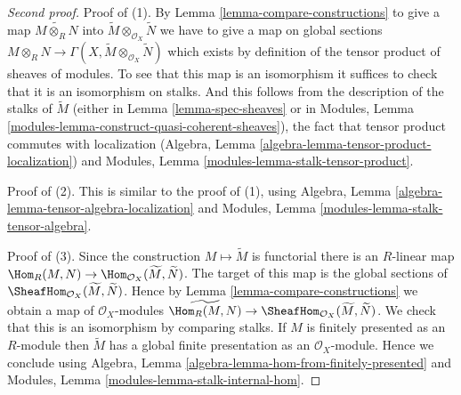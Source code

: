\begin{proof}[Second proof]
Proof of (1). By Lemma \ref{lemma-compare-constructions} to give a map
$\widetilde{M \otimes_R N}$ into
$\widetilde M \otimes_{\mathcal{O}_X} \widetilde N$
we have to give a map on global sections
$M \otimes_R N \to
\Gamma(X, \widetilde M \otimes_{\mathcal{O}_X} \widetilde N)$
which exists by definition of the tensor product of sheaves
of modules. To see that this map is an isomorphism it
suffices to check that it is an isomorphism on stalks.
And this follows from the description of the stalks
of $\widetilde{M}$ (either in Lemma \ref{lemma-spec-sheaves} or in
Modules, Lemma \ref{modules-lemma-construct-quasi-coherent-sheaves}),
the fact that tensor product commutes with localization
(Algebra, Lemma \ref{algebra-lemma-tensor-product-localization}) and
Modules, Lemma \ref{modules-lemma-stalk-tensor-product}.

\medskip\noindent
Proof of (2). This is similar to the proof of (1), using
Algebra, Lemma \ref{algebra-lemma-tensor-algebra-localization} and
Modules, Lemma \ref{modules-lemma-stalk-tensor-algebra}.

\medskip\noindent
Proof of (3). Since the construction $M \mapsto \widetilde{M}$ is functorial
there is an $R$-linear map
$\Hom_R(M, N) \to \Hom_{\mathcal{O}_X}(\widetilde{M}, \widetilde{N})$.
The target of this map is the global sections of
$\SheafHom_{\mathcal{O}_X}(\widetilde M, \widetilde N)$.
Hence by Lemma \ref{lemma-compare-constructions} we obtain a map
of $\mathcal{O}_X$-modules $\widetilde{\Hom_R(M,  N)} \to
\SheafHom_{\mathcal{O}_X}(\widetilde M, \widetilde N)$.
We check that this is an isomorphism by comparing stalks.
If $M$ is finitely presented as an $R$-module
then $\widetilde M$ has a global finite presentation as an
$\mathcal{O}_X$-module. Hence we conclude using
Algebra, Lemma \ref{algebra-lemma-hom-from-finitely-presented} and
Modules, Lemma \ref{modules-lemma-stalk-internal-hom}.
\end{proof}

